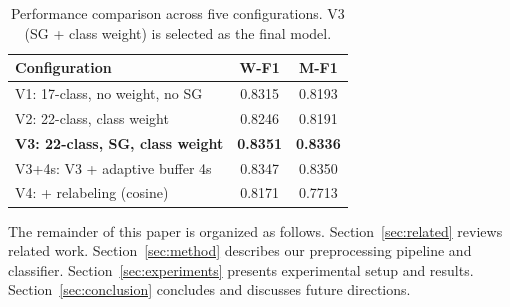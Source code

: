 \begin{table}[h]
\centering
\caption{Performance comparison across five configurations. V3 (SG + class weight) is selected as the final model.}
\label{tab:results}
\begin{tabular}{lcc}
\toprule
\textbf{Configuration} & \textbf{W-F1} & \textbf{M-F1} \\
\midrule
V1: 17-class, no weight, no SG   & 0.8315 & 0.8193 \\
V2: 22-class, class weight       & 0.8246 & 0.8191 \\
\textbf{V3: 22-class, SG, class weight} & \textbf{0.8351} & \textbf{0.8336} \\
V3+4s: V3 + adaptive buffer 4s   & 0.8347 & 0.8350 \\
V4: + relabeling (cosine)        & 0.8171 & 0.7713 \\
\bottomrule
\end{tabular}
\end{table}

The remainder of this paper is organized as follows. Section~\ref{sec:related} reviews related work. Section~\ref{sec:method} describes our preprocessing pipeline and classifier. Section~\ref{sec:experiments} presents experimental setup and results. Section~\ref{sec:conclusion} concludes and discusses future directions.

